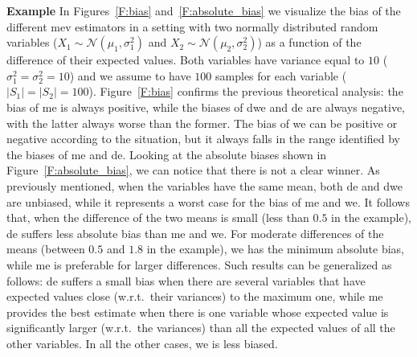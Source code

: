 \textbf{Example} In Figures~\ref{F:bias} and~\ref{F:absolute_bias} we visualize the bias of the different \gls{mev} estimators in a setting with two normally distributed random variables ($X_1\sim\mathcal{N}(\mu_1,\sigma_1^2)$ and $X_2\sim\mathcal{N}(\mu_2,\sigma_2^2)$) as a function of the difference of their expected values. Both variables have variance equal to $10$ ($\sigma_1^2=\sigma_2^2=10$) and we assume to have $100$ samples for each variable ($|S_1|=|S_2|=100$).
Figure~\ref{F:bias} confirms the previous theoretical analysis: the bias of \gls{me} is always positive, while the biases of \gls{dwe} and \gls{de} are always negative, with the latter always worse than the former.
The bias of \gls{we} can be positive or negative according to the situation, but it always falls in the range identified by the biases of \gls{me} and \gls{de}.
Looking at the absolute biases shown in Figure~\ref{F:absolute_bias}, we can notice that there is not a clear winner.
As previously mentioned, when the variables have the same mean, both \gls{de} and \gls{dwe} are unbiased, while it represents a worst case for the bias of \gls{me} and \gls{we}. It follows that, when the difference of the two means is small (less than $0.5$ in the example), \gls{de} suffers less absolute bias than \gls{me} and \gls{we}. For moderate differences of the means (between $0.5$ and $1.8$ in the example), \gls{we} has the minimum absolute bias, while \gls{me} is preferable for larger differences.
Such results can be generalized as follows: \gls{de} suffers a small bias when there are several variables that have expected values close (w.r.t.~their variances) to the maximum one, while \gls{me} provides the best estimate when there is one variable whose expected value is significantly larger (w.r.t.~the variances) than all the expected values of all the other variables. In all the other cases, \gls{we} is less biased.

